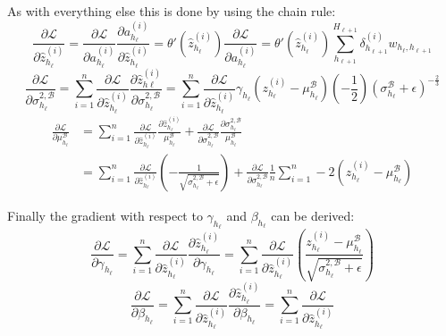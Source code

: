 As with everything else this is done by using the chain rule:
\begin{equation}
\frac{\partial \mathcal{L}}{\partial \hat{z}_{h_\ell}^{(i)}} = \frac{\partial \mathcal{L}}{\partial a_{h_\ell}^{(i)}} \frac{\partial a_{h_\ell}^{(i)}}{\partial \hat{z}_{h_\ell}^{(i)}} = \theta'(\hat{z}_{h_\ell}^{(i)}) \frac{\partial\mathcal{L}}{\partial a_{h_\ell}^{(i)}} = \theta'(\hat{z}_{h_\ell}^{(i)}) \sum_{h_{\ell+1}}^{H_{\ell+1}} \delta_{h_{\ell+1}}^{(i)} w_{h_\ell, h_{\ell+1}}
\end{equation}
\begin{equation}
\frac{\partial \mathcal{L}}{\partial \sigma_{h_\ell}^{2,\mathcal{B}}} = \sum_{i=1}^n \frac{\partial \mathcal{L}}{\partial \hat{z}_{h_\ell}^{(i)}} \frac{\partial \hat{z}_{h\ell}^{(i)}}{\partial \sigma_{h_\ell}^{2, \mathcal{B}}} = \sum_{i=1}^n \frac{\partial \mathcal{L}}{\partial \hat{z}_{h_\ell}^{(i)}} \gamma_{h_\ell} \left(z_{h_\ell}^{(i)} - \mu_{h_\ell}^{\mathcal{B}}\right) \left(-\frac{1}{2}\right) \left(\sigma_{h_\ell}^{\mathcal{B}} + \epsilon\right)^{-\frac{2}{3}}
\end{equation}
\begin{equation}
\begin{aligned}
\frac{\partial \mathcal{L}}{\partial \mu_{h_\ell}^{\mathcal{B}}} &= \sum_{i=1}^n \frac{\partial \mathcal{L}}{\partial \hat{z}_{h_\ell}^{(i)}} \frac{\partial \hat{z}_{h_\ell}^{(i)}}{\mu_{h_\ell}^{\mathcal{B}}} + \frac{\partial \mathcal{L}}{\partial \sigma_{h_\ell}^{2, \mathcal{B}}} \frac{\partial \sigma_{h_\ell}^{2, \mathcal{B}}}{\mu_{h_\ell}^{\mathcal{B}}} \\
&= \sum_{i=1}^n \frac{\partial \mathcal{L}}{\partial \hat{z}_{h_\ell}^{(i)}} \left(- \frac{1}{\sqrt{\sigma_{h_\ell}^{2, \mathcal{B}} + \epsilon}}\right) + \frac{\partial \mathcal{L}}{\partial \sigma_{h_\ell}^{2, \mathcal{B}}} \frac{1}{n} \sum_{i=1}^n -2 \left(z_{h_\ell}^{(i)} - \mu_{h_\ell}^{\mathcal{B}}\right)
\end{aligned}
\end{equation}

Finally the gradient with respect to $\gamma_{h_\ell}$ and $\beta_{h_\ell}$ can be derived:
\begin{equation}
\frac{\partial \mathcal{L}}{\partial \gamma_{h_\ell}} = \sum_{i=1}^n \frac{\partial \mathcal{L}}{\partial \hat{z}_{h_\ell}^{(i)}} \frac{\partial \hat{z}_{h_\ell}^{(i)}}{\partial \gamma_{h_\ell}} = \sum_{i=1}^n \frac{\partial \mathcal{L}}{\partial \hat{z}_{h_\ell}^{(i)}} \left(\frac{z_{h_\ell}^{(i)} - \mu_{h_\ell}^{\mathcal{B}}}{\sqrt{\sigma_{h_\ell}^{2, \mathcal{B}} + \epsilon}} \right)
\end{equation}
\begin{equation}
\frac{\partial \mathcal{L}}{\partial \beta_{h_\ell}} = \sum_{i=1}^n \frac{\partial \mathcal{L}}{\partial \hat{z}_{h_\ell}^{(i)}} \frac{\partial \hat{z}_{h_\ell}^{(i)}}{\partial \beta_{h_\ell}} = \sum_{i=1}^n \frac{\partial \mathcal{L}}{\partial \hat{z}_{h_\ell}^{(i)}}
\end{equation}

